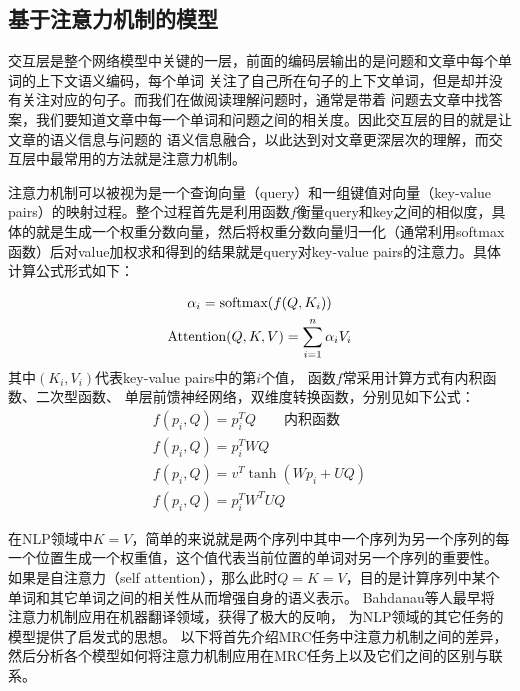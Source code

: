 \subsection{基于注意力机制的模型}\label{attention}
交互层是整个网络模型中关键的一层，前面的编码层输出的是问题和文章中每个单词的上下文语义编码，每个单词
关注了自己所在句子的上下文单词，但是却并没有关注对应的句子。而我们在做阅读理解问题时，通常是带着
问题去文章中找答案，我们要知道文章中每一个单词和问题之间的相关度。因此交互层的目的就是让文章的语义信息与问题的
语义信息融合，以此达到对文章更深层次的理解，而交互层中最常用的方法就是注意力机制。

注意力机制可以被视为是一个查询向量（query）和一组键值对向量（key-value pairs）的映射过程。整个过程首先是利用函数$f$衡量query和key之间的相似度，具体的就是生成一个权重分数向量，然后将权重分数向量归一化（通常利用softmax函数）后对value加权求和得到的结果就是query对key-value pairs的注意力。具体计算公式形式如下：

\begin{gather}
\alpha_i=\text{softmax}(f(Q,K_i)) \notag \\
\text{Attention}(Q,K,V)=\sum_{i=1}^{n}\alpha_iV_i
\end{gather}
其中$(K_i,V_i)$代表key-value pairs中的第$i$个值，
函数$f$常采用计算方式有内积函数、二次型函数、
单层前馈神经网络，双维度转换函数，分别见如下公式：
\begin{gather}
f(p_i,Q)=p_i^TQ \qquad \text{内积函数} \\
f(p_i,Q)=p_i^TWQ\\
f(p_i,Q)=v^T\tanh(Wp_i+UQ) \\
f(p_i,Q)=p_i^TW^TUQ 
\end{gather}

在NLP领域中$K=V$，简单的来说就是两个序列中其中一个序列为另一个序列的每一个位置生成一个权重值，这个值代表当前位置的单词对另一个序列的重要性。
如果是自注意力（self attention），那么此时$Q=K=V$，目的是计算序列中某个单词和其它单词之间的相关性从而增强自身的语义表示。
Bahdanau等人最早将
注意力机制应用在机器翻译领域，获得了极大的反响，
为NLP领域的其它任务的模型提供了启发式的思想。
以下将首先介绍MRC任务中注意力机制之间的差异，然后分析各个模型如何将注意力机制应用在MRC任务上以及它们之间的区别与联系。

